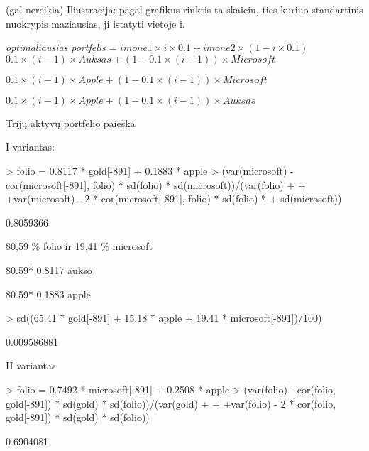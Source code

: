 \documentclass[12pt, a14paper, lithuanian]{article}
\begin{document}
(gal nereikia)
Iliustracija: pagal grafikus rinktis ta skaiciu, ties kuriuo standartinis nuokrypis maziausias, ji istatyti vietoje i.

\textit{optimaliausias portfelis} = $imone1 \times i \times 0.1 + imone2 \times (1 - i\times 0.1)$ \\


$0.1 \times (i-1) \times Auksas + (1-0.1 \times (i-1)) \times Microsoft$

$0.1 \times (i-1) \times Apple + (1-0.1 \times (i-1)) \times Microsoft$

$0.1 \times (i-1) \times Apple + (1-0.1\times (i-1)) \times Auksas$

\item Trijų aktyvų portfelio paieška 

I variantas:

\begin{Schunk}
\begin{Sinput}
> folio = 0.8117 * gold[-891] + 0.1883 * apple
> (var(microsoft) - cor(microsoft[-891], folio) * sd(folio) * sd(microsoft))/(var(folio) + 
+     +var(microsoft) - 2 * cor(microsoft[-891], folio) * sd(folio) * 
+     sd(microsoft))
\end{Sinput}
\begin{Soutput}
[1] 0.8059366
\end{Soutput}
\end{Schunk}

80,59 \% folio ir 19,41 \% microsoft

80.59* 0.8117 aukso

80.59* 0.1883 apple
\begin{Schunk}
\begin{Sinput}
> sd((65.41 * gold[-891] + 15.18 * apple + 19.41 * microsoft[-891])/100)
\end{Sinput}
\begin{Soutput}
[1] 0.009586881
\end{Soutput}
\end{Schunk}


II variantas

\begin{Schunk}
\begin{Sinput}
> folio = 0.7492 * microsoft[-891] + 0.2508 * apple
> (var(folio) - cor(folio, gold[-891]) * sd(gold) * sd(folio))/(var(gold) + 
+     +var(folio) - 2 * cor(folio, gold[-891]) * sd(gold) * sd(folio))
\end{Sinput}
\begin{Soutput}
[1] 0.6904081
\end{Soutput}
\end{Schunk}
\end{document}
